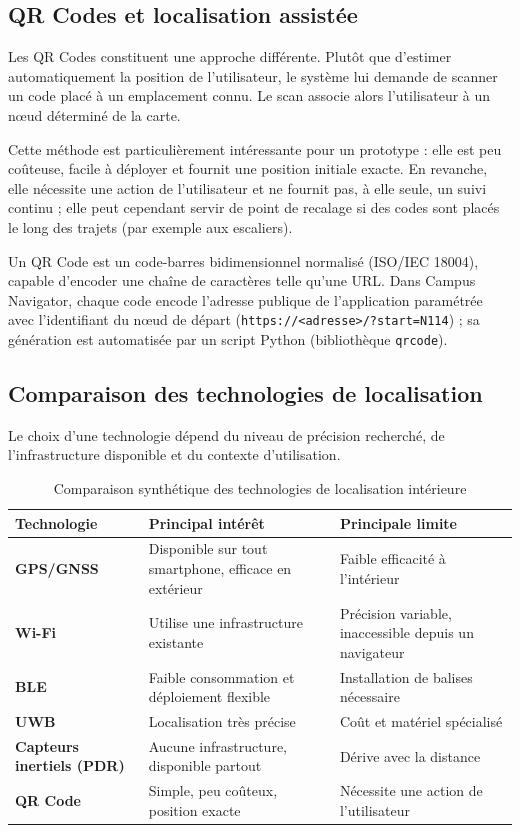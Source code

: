 \documentclass[12pt,a4paper]{report}
\begin{document}
\subsection{QR Codes et localisation assistée}

Les QR Codes constituent une approche différente. Plutôt que d'estimer automatiquement la position
de l'utilisateur, le système lui demande de scanner un code placé à un emplacement connu. Le scan
associe alors l'utilisateur à un nœud déterminé de la carte.

Cette méthode est particulièrement intéressante pour un prototype : elle est peu coûteuse, facile
à déployer et fournit une position initiale exacte. En revanche, elle nécessite une action de
l'utilisateur et ne fournit pas, à elle seule, un suivi continu ; elle peut cependant servir de
point de recalage si des codes sont placés le long des trajets (par exemple aux escaliers).

Un QR Code est un code-barres bidimensionnel normalisé (ISO/IEC 18004), capable d'encoder une
chaîne de caractères telle qu'une URL. Dans Campus Navigator, chaque code encode l'adresse
publique de l'application paramétrée avec l'identifiant du nœud de départ
(\texttt{https://<adresse>/?start=N114}) ; sa génération est automatisée par un script Python
(bibliothèque \texttt{qrcode}).

\subsection{Comparaison des technologies de localisation}

Le choix d'une technologie dépend du niveau de précision recherché, de l'infrastructure disponible
et du contexte d'utilisation.

\begin{table}[h]
\centering
\caption{Comparaison synthétique des technologies de localisation intérieure}
\label{tab:loc}
\small
\begin{tabularx}{\linewidth}{@{}lXX@{}}
\toprule
\textbf{Technologie} & \textbf{Principal intérêt} & \textbf{Principale limite}\\
\midrule
\textbf{GPS/GNSS} & Disponible sur tout smartphone, efficace en extérieur & Faible efficacité à l'intérieur\\
\textbf{Wi-Fi} & Utilise une infrastructure existante & Précision variable, inaccessible depuis un navigateur\\
\textbf{BLE} & Faible consommation et déploiement flexible & Installation de balises nécessaire\\
\textbf{UWB} & Localisation très précise & Coût et matériel spécialisé\\
\textbf{Capteurs inertiels (PDR)} & Aucune infrastructure, disponible partout & Dérive avec la distance\\
\textbf{QR Code} & Simple, peu coûteux, position exacte & Nécessite une action de l'utilisateur\\
\bottomrule
\end{tabularx}
\end{table}
\end{document}
